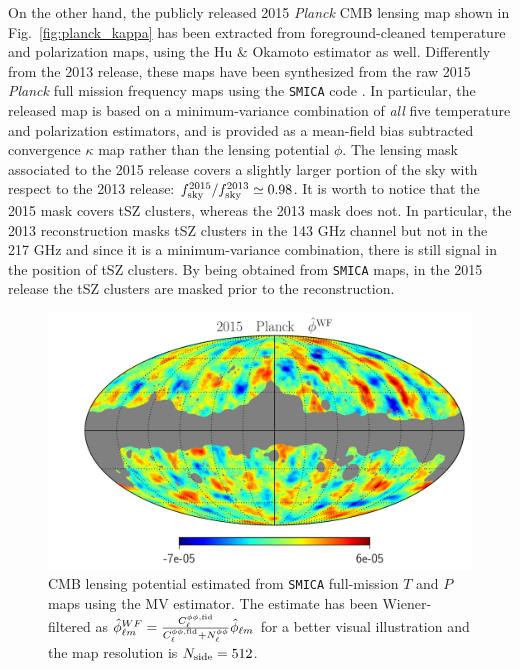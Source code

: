 On the other hand, the publicly released 2015 \textit{Planck} CMB lensing map \citep{PlanckCollaboration2015} shown in Fig.~\eqref{fig:planck_kappa} has been extracted from foreground-cleaned temperature and polarization maps, using the Hu \& Okamoto estimator as well. Differently from the 2013 release, these maps have been synthesized from the raw 2015 \emph{Planck} full mission frequency maps using the \texttt{SMICA} code \citep{PlanckCollaboration2015f}. In particular, the released map is based on a minimum-variance combination of \emph{all} five temperature and polarization estimators, and is provided as a mean-field bias subtracted convergence $\kappa$ map rather than the lensing potential $\phi$. The lensing mask associated to the 2015 release covers a slightly larger portion of the sky with respect to the 2013 release: $f_{\rm{sky}}^{2015}/f_{\rm{sky}}^{2013}\simeq0.98$. It is worth to notice that the 2015 mask covers tSZ clusters, whereas the 2013 mask does not. In particular, the 2013 reconstruction masks tSZ clusters in the 143 GHz channel but not in the 217 GHz and since it is a minimum-variance combination, there is still signal in the position of tSZ clusters. By being obtained from \texttt{SMICA} maps, in the 2015 release the tSZ clusters are masked prior to the reconstruction.

\begin{figure}[t] %
\centering %
\includegraphics[width=\textwidth]{Chapter2/Images/Planck_kappa_CMB}
\caption{\gls{CMB} lensing potential estimated from \texttt{SMICA} full-mission $T$ and $P$ maps using the MV estimator. The estimate has been Wiener-filtered as $\hat{\phi}^{WF}_{\ell m}= \frac{C_{\ell}^{\phi\phi, \rm{fid}}}{C_{\ell}^{\phi\phi, \rm{fid}}+N_{\ell}^{\phi\phi}}\hat{\phi}_{\ell m}$ for a better visual illustration and the map resolution is $N_{\rm{side}}=512$. \label{fig:planck_kappa}}
\end{figure}


